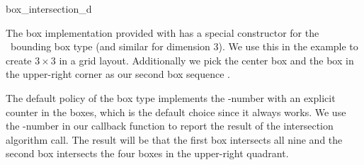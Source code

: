 \begin{ccRefFunction}{box_intersection_d}
\ccExample

The box implementation provided with
 has a special
constructor for the \cgal\ bounding box type  (and
similar for dimension 3). We use this in the example to create $3
\times 3$  in a grid layout. Additionally we pick the
center box and the box in the upper-right corner as our second box
sequence .

The default policy of the box type implements the -number with
an explicit counter in the boxes, which is the default choice since it
always works. We use the -number in our callback function to
report the result of the intersection algorithm call. The result will
be that the first  box intersects all nine  and
the second  box intersects the four boxes in the
upper-right quadrant.


\end{ccRefFunction}


